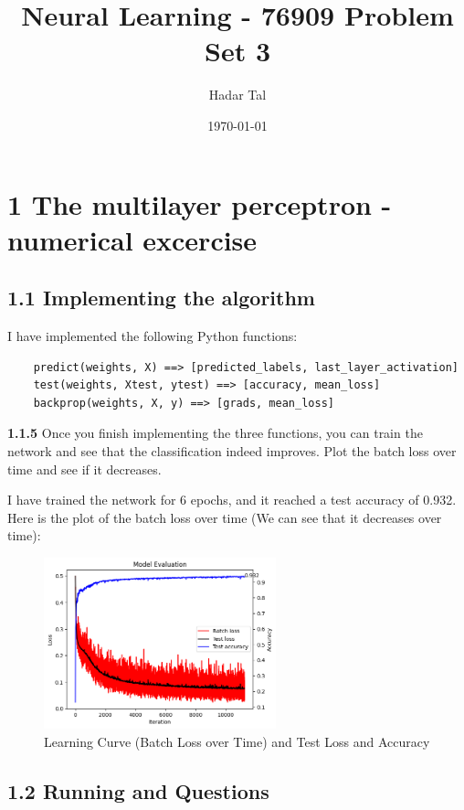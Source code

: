 \documentclass[a4paper, 12pt]{article}
\title{Neural Learning - 76909 Problem Set 3}
\author{Hadar Tal}
\date{\today}
\begin{document}
\maketitle

\section*{1 The multilayer perceptron - numerical excercise}

\subsection*{1.1 Implementing the algorithm}

I have implemented the following Python functions:
\begin{lstlisting}
    predict(weights, X) ==> [predicted_labels, last_layer_activation]
    test(weights, Xtest, ytest) ==> [accuracy, mean_loss]
    backprop(weights, X, y) ==> [grads, mean_loss]
\end{lstlisting}
\bigskip
 \textcolor{myblue}{ \textbf{1.1.5} Once you finish implementing the three functions, you can train the network and see that the
classification indeed improves. Plot the batch loss over time and see if it decreases. }

I have trained the network for 6 epochs, and it reached a test accuracy of 0.932.
Here is the plot of the batch loss over time (We can see that it decreases over time): 

\begin{figure}[H]
    \centering
    \includegraphics[width=0.6\textwidth]{../figs/1-1-5.png}   
    \caption{Learning Curve (Batch Loss over Time) and Test Loss and Accuracy} 
    \label{fig:scenario1}
\end{figure}


\subsection*{1.2 Running and Questions}
\end{document}

